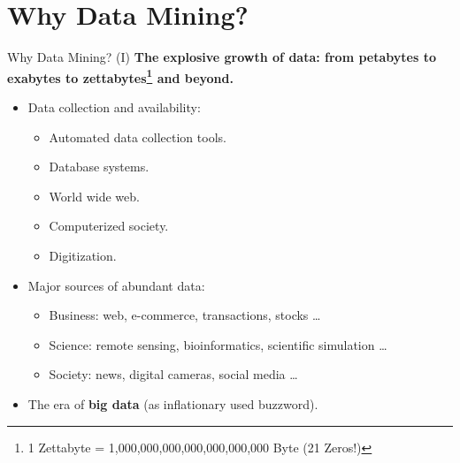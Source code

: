 \section{Why Data Mining?}

\begin{frame}{Why Data Mining? (I)}
	\textbf{The explosive growth of data: from petabytes to exabytes to zettabytes\footnote{1 Zettabyte = 1,000,000,000,000,000,000,000 Byte (21 Zeros!)} and
		beyond.}\\
	\begin{itemize}
		\item Data collection and availability:
		      \begin{itemize}
			      \item Automated data collection tools.
			      \item Database systems.
			      \item World wide web.
			      \item Computerized society.
			      \item Digitization.
		      \end{itemize}
		\item Major sources of abundant data:
		      \begin{itemize}
			      \item Business: web, e-commerce, transactions, stocks \ldots
			      \item Science: remote sensing, bioinformatics, scientific
			            simulation \ldots
			      \item Society: news, digital cameras, social media \ldots
		      \end{itemize}
		\item The era of \textbf{big data} (as inflationary used buzzword).
	\end{itemize}
\end{frame}

